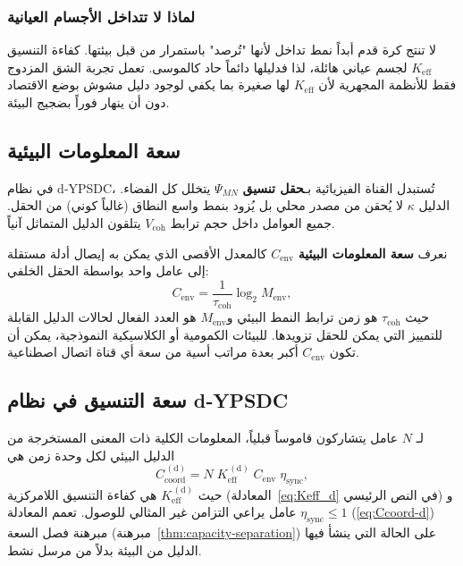 \documentclass[12pt,a4paper]{article}
\theoremstyle{remark}
\begin{document}
	\subsubsection{لماذا لا تتداخل الأجسام العيانية}
	
	لا تنتج كرة قدم أبداً نمط تداخل لأنها "تُرصد" باستمرار من قبل بيئتها. كفاءة التنسيق \(K_{\mathrm{eff}}\) لجسم عياني هائلة، لذا فدليلها دائماً حاد كالموسى. تعمل تجربة الشق المزدوج فقط للأنظمة المجهرية لأن \(K_{\mathrm{eff}}\) لها صغيرة بما يكفي لوجود دليل مشوش بوضع الاقتصاد دون أن ينهار فوراً بضجيج البيئة.
	
	\subsection{سعة المعلومات البيئية}
	\label{subsec:env-capacity}
	
	في نظام d‑YPSDC، تُستبدل القناة الفيزيائية بـ\textbf{حقل تنسيق} \(\Psi_{MN}\) يتخلل كل الفضاء. الدليل \(\kappa\) لا يُحقن من مصدر محلي بل يُزود بنمط واسع النطاق (غالباً كوني) من الحقل. جميع العوامل داخل حجم ترابط \(V_{\mathrm{coh}}\) يتلقون الدليل المتماثل آنياً.
	
	نعرف \textbf{سعة المعلومات البيئية} \(C_{\mathrm{env}}\) كالمعدل الأقصى الذي يمكن به إيصال أدلة مستقلة إلى عامل واحد بواسطة الحقل الخلفي:
	\begin{equation}
		C_{\mathrm{env}} = \frac{1}{\tau_{\mathrm{coh}}} \log_2 M_{\mathrm{env}},
		\label{eq:Cenv}
	\end{equation}
	حيث \(\tau_{\mathrm{coh}}\) هو زمن ترابط النمط البيئي و\(M_{\mathrm{env}}\) هو العدد الفعال لحالات الدليل القابلة للتمييز التي يمكن للحقل تزويدها. للبيئات الكمومية أو الكلاسيكية النموذجية، يمكن أن تكون \(C_{\mathrm{env}}\) أكبر بعدة مراتب أسية من سعة أي قناة اتصال اصطناعية.
	
	\subsection{سعة التنسيق في نظام d‑YPSDC}
	\label{subsec:coord-capacity-dypsdc}
	
	لـ \(N\) عامل يتشاركون قاموساً قبلياً، المعلومات الكلية ذات المعنى المستخرجة من الدليل البيئي لكل وحدة زمن هي
	\begin{equation}
		C_{\mathrm{coord}}^{\,(\mathrm{d})} = N \; K_{\mathrm{eff}}^{\,(\mathrm{d})} \;
		C_{\mathrm{env}} \; \eta_{\mathrm{sync}},
		\label{eq:Ccoord-d}
	\end{equation}
	حيث \(K_{\mathrm{eff}}^{\,(\mathrm{d})}\) هي كفاءة التنسيق اللامركزية (المعادلة~\eqref{eq:Keff_d} في النص الرئيسي) و\(\eta_{\mathrm{sync}} \le 1\) عامل يراعي التزامن غير المثالي للوصول. تعمم المعادلة (\ref{eq:Ccoord-d}) مبرهنة فصل السعة (مبرهنة~\ref{thm:capacity-separation}) على الحالة التي ينشأ فيها الدليل من البيئة بدلاً من مرسل نشط.
	
\end{document}
